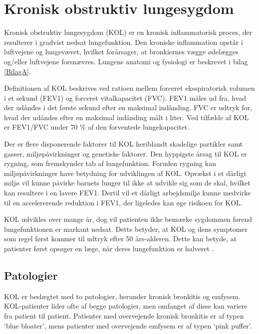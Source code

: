 \section{Kronisk obstruktiv lungesygdom}
Kronisk obstruktiv lungesygdom (KOL) er en kronisk inflammatorisk proces, der resulterer i gradvist nedsat lungefunktion. Den kroniske inflammation opstår i luftvejene og lungevævet, hvilket forårsager, at bronkiernes vægge ødelægges og/eller luftvejene forsnævres.\cite{Basisbogen2016} Lungens anatomi og fysiologi er beskrevet i bilag \ref{BilagA}. 

Definitionen af KOL beskrives ved ratioen mellem forceret eksspiratorisk volumen i et sekund (FEV1) og forceret vitalkapacitet (FVC). FEV1 måles ud fra, hvad der udåndes i det første sekund efter en maksimal indånding. FVC er udtryk for, hvad der udåndes efter en maksimal indånding målt i liter. Ved tilfælde af KOL er FEV1/FVC under 70 \% af den forventede lungekapacitet. 

Der er flere disponerende faktorer til KOL heriblandt skadelige partikler samt gasser, miljøpåvirkninger og genetiske faktorer. Den hyppigste årsag til KOL er rygning, som fremskynder tab af lungefunktion.\cite{Basisbogen2016,Martinez2016,dsam2016} Foruden rygning kan miljøpåvirkninger have betydning for udviklingen af KOL. Opvækst i et dårligt miljø vil kunne påvirke barnets lunger til ikke at udvikle sig som de skal, hvilket kan resultere i en lavere FEV1. Dertil vil et dårligt arbejdsmiljø kunne medvirke til en accelererende reduktion i FEV1, der ligeledes kan øge risikoen for KOL. \cite{Martinez2016} 

KOL udvikles over mange år, dog vil patienten ikke bemærke sygdommen førend lungefunktionen er markant nedsat. Dette betyder, at KOL og dens symptomer som regel først kommer til udtryk efter 50 års-alderen\cite{Lange2015}. Dette kan betyde, at patienter først opsøger en læge, når deres lungefunktion er halveret \cite{dsam2016}. 

\subsection{Patologier}
KOL er beslægtet med to patologier, herunder kronisk bronkitis og emfysem. KOL-patienter lider ofte af begge patologier, men omfanget af disse kan variere fra patient til patient. Patienter med overvejende kronisk bronkitis er af typen ‘blue bloater’, mens patienter med overvejende emfysem er af typen ‘pink puffer'.\cite{Basisbogen2016,Healthguidances2016}

